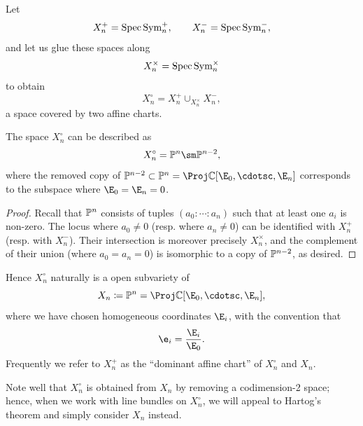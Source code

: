 \documentclass[11pt,reqno]{amsart}
\begin{document}
Let
\[X_n^+=\operatorname{Spec}\operatorname{Sym}_n^+,\qquad X_n^-=\operatorname{Spec}\operatorname{Sym}_n^-,\]
and let us glue these spaces along
\[X_n^\times=\operatorname{Spec} \operatorname{Sym}_n^\times\] 
to obtain
\[X_n^\circ=X_n^+\cup_{X_n^\times} X_n^-,\] 
a space covered by two affine charts.
\begin{proposition}\label{prop: Xn description}
    The space $ X_n^\circ$ can be described as
    \[ X_n^\circ=\BP^n\sm\BP^{n-2},\]
    where the removed copy of $\BP^{n-2}\subset \BP^n=\Proj\BC[\E_0,\cdotsc,\E_n]$ corresponds to the subspace where $\E_0=\E_n=0$. 
\end{proposition}
\begin{proof}
    Recall that $\mathbb P^n$ consists of tuples $(a_0\colon\cdots\colon a_n)$ such that at least one $a_i$ is non-zero. The locus where $a_0\ne 0$ (resp. where $a_n\ne 0$) can be identified with $X_n^+$ (resp. with $X_n^-$). Their intersection is moreover precisely $X_n^\times$, and the complement of their union (where $a_0 = a_n = 0$) is isomorphic to a copy of $\mathbb P^{n-2}$, as desired.
\end{proof}

Hence $X_n^\circ$ naturally is a open subvariety of
\[X_n\coloneqq \BP^n=\Proj\BC[\E_0,\cdotsc,\E_n],\] 
where we have chosen homogeneous coordinates $\E_i$, with the convention that
\[\e_i=\frac{\E_i}{\E_0}.\] 
Frequently we refer to $X_n^+$ as the ``dominant affine chart'' of $X_n^\circ$ and $X_n$.

Note well that $X_n^\circ $ is obtained from $X_n$ by removing a codimension-2 space; hence, when we work with line bundles on $X_n^\circ$, we will appeal to Hartog's theorem and simply consider $X_n$ instead. 
\end{document}
